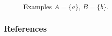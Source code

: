\begin{frame}
\begin{figure}[ht]
\begin{center}
\begin{tabular}{cc}
        
              
          \end{tabular}
        \end{center}
        \caption{Examples $A = \{a\}$, $B = \{ b\}$.}
      \end{figure}

\end{frame}

\begin{frame}[allowframebreaks]
    \frametitle{References}
    
    
\end{frame}

